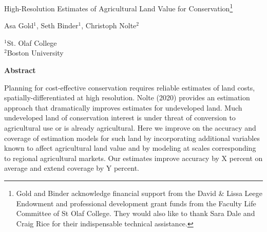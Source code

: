 \documentclass[12pt]{article}
\begin{document}
\hspace{5pt}

\Large
 \begin{center}
High-Resolution Estimates of Agricultural Land Value for Conservation\footnote[2]{Gold and Binder acknowledge financial support from the David \& Lissa Leege Endowment and professional development grant funds from the Faculty Life Committee of St Olaf College. They would also like to thank Sara Dale and Craig Rice for their indispensable technical assistance.}\\ 

\vspace{10pt}

\large
Asa Gold$^1$, Seth Binder$^1$, Christoph Nolte$^2$ \\

\vspace{10pt}

\footnotesize  
$^{1}$St. Olaf College\\
$^2$Boston University

\vspace{40pt} 

    \normalsize
    \textbf{Abstract}
\end{center}

\small
Planning for cost-effective conservation requires reliable estimates of land costs, spatially-differentiated at high resolution. Nolte (2020) provides an estimation approach that dramatically improves estimates for undeveloped land. Much undeveloped land of conservation interest is under threat of conversion to agricultural use or is already agricultural. Here we improve on the accuracy and coverage of estimation models for such land by incorporating additional variables known to affect agricultural land value and by modeling at scales corresponding to regional agricultural markets. Our estimates improve accuracy by X percent on average and extend coverage by Y percent. 

\newpage
\end{document}
